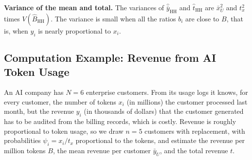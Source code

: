 \documentclass[
  letterpaper,
  DIV=11,
  numbers=noendperiod]{scrreprt}
\renewcommand{\[}{\begin{equation}}
\renewcommand{\]}{\end{equation}}
\begin{document}
\textbf{Variance of the mean and total.} The variances of
\(\hat{\bar{y}}_{\mathrm{HH}}\) and \(\hat{t}_{\mathrm{HH}}\) are
\(\bar{x}_U^2\) and \(t_x^2\) times \(V(\hat{B}_{\mathrm{HH}})\). The
variance is small when all the ratios \(b_i\) are close to \(B\), that
is, when \(y_i\) is nearly proportional to \(x_i\).

\subsection{Computation Example: Revenue from AI Token
Usage}\label{sec-ups-toy-sample}

An AI company has \(N=6\) enterprise customers. From its usage logs it
knows, for every customer, the number of tokens \(x_i\) (in millions)
the customer processed last month, but the revenue \(y_i\) (in thousands
of dollars) that the customer generated has to be audited from the
billing records, which is costly. Revenue is roughly proportional to
token usage, so we draw \(n=5\) customers with replacement, with
probabilities \(\psi_i=x_i/t_x\) proportional to the tokens, and
estimate the revenue per million tokens \(B\), the mean revenue per
customer \(\bar{y}_U\), and the total revenue \(t\).
\end{document}
